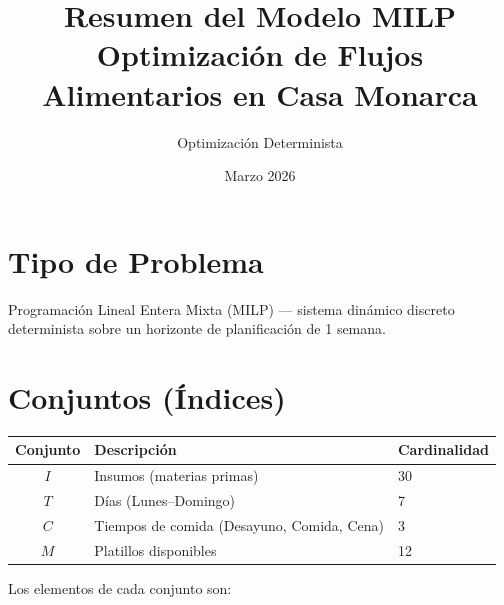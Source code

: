 \documentclass[12pt, letterpaper]{article}
\title{\textbf{Resumen del Modelo MILP}\\
\large Optimización de Flujos Alimentarios en Casa Monarca}
\author{Optimización Determinista}
\date{Marzo 2026}
\begin{document}
\maketitle

\section*{Tipo de Problema}

Programación Lineal Entera Mixta (MILP) — sistema dinámico discreto determinista sobre un horizonte de planificación de 1 semana.

\section{Conjuntos (Índices)}

\begin{table}[h!]
\centering
\begin{tabular}{cll}
\toprule
\textbf{Conjunto} & \textbf{Descripción} & \textbf{Cardinalidad} \\
\midrule
$I$ & Insumos (materias primas) & 30 \\
$T$ & Días (Lunes–Domingo) & 7 \\
$C$ & Tiempos de comida (Desayuno, Comida, Cena) & 3 \\
$M$ & Platillos disponibles & 12 \\
\bottomrule
\end{tabular}
\end{table}

\noindent Los elementos de cada conjunto son:
\end{document}
